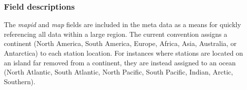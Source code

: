 \subsubsection{Field descriptions}
\label{sec:dbmtdes}
The \emph{mapid} and \emph{map} fields are included in the meta data as a means for quickly referencing all data within a large region.  
The current convention assigns a continent (North America, South America, Europe, Africa, Asia, Australia, or Antarctica) to each station location.  
For instances where stations are located on an island far removed from a continent, they are instead assigned to an ocean (North Atlantic, South Atlantic, North Pacific, South Pacific, Indian, Arctic, Southern).

